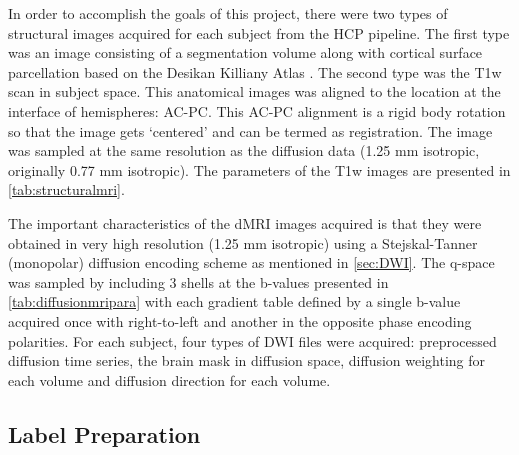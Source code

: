 \documentclass[msthesis.tex]{subfiles}
\begin{document}
In order to accomplish the goals of this project, there were two types of structural images acquired for each subject from the \gls{HCP} pipeline. The first type was an image consisting of a segmentation volume along with cortical surface parcellation based on the Desikan Killiany Atlas \citep{desikan2006automated}. The second type was the T1w scan in subject space. This anatomical images was aligned to the location at the interface of hemispheres: \gls{AC-PC}. This \gls{AC-PC} alignment is a rigid body rotation so that the image gets `centered' and can be termed as registration. The image was sampled at the same resolution as the diffusion data (1.25 mm isotropic, originally 0.77 mm isotropic). The parameters of the T1w images are presented in \autoref{tab:structuralmri}.

The important characteristics of the \gls{dMRI} images acquired is that they were obtained in very high resolution (1.25 mm isotropic) using a Stejskal-Tanner (monopolar) diffusion encoding scheme as mentioned in \autoref{sec:DWI}. The q-space was sampled by including 3 shells at the b-values presented in \autoref{tab:diffusionmripara} with each gradient table defined by a single b-value acquired once with right-to-left and another in the opposite phase encoding polarities. For each subject, four types of DWI files were acquired: preprocessed diffusion time series, the brain mask in diffusion space,  diffusion weighting for each volume and diffusion direction for each volume.


\subsection{Label Preparation}
\label{sec:label_preparation}

\end{document}
